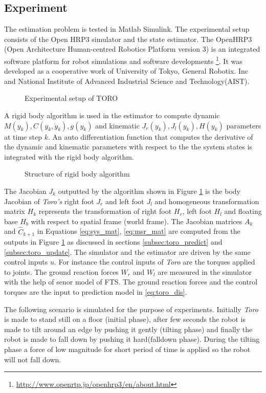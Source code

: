 \subsection{Experiment}
The estimation problem is tested in Matlab Simulink. The experimental setup consists of the Open HRP3 simulator and the state estimator. The OpenHRP3 (Open Architecture Human-centred Robotics Platform version 3) is an integrated software platform for robot simulations and software developments \footnote{\url{http://www.openrtp.jp/openhrp3/en/about.html}}. It was developed as a cooperative work of University of Tokyo, General Robotix. Inc and National Institute of Advanced Industrial Science and Technology(AIST).

\begin{figure}
    \centering
    
    \caption{Experimental setup of TORO}
\end{figure}

A rigid body algorithm is used in the estimator to compute dynamic $M(y_k), C(y_k,\dot y_k), g(y_k)$ and kinematic $J_r(y_k), J_l(y_k), H(y_k)$ parameters at time step $k$. An auto differentiation function that computes the derivative of the dynamic and kinematic parameters with respect to the the system states is integrated with the rigid body algorithm. 
\begin{figure}[h]
    \centering
    
    \caption{Structure of rigid body algorithm}
    \label{fig:luc_dyn}
\end{figure}
The Jacobian $J_k$ outputted by the algorithm shown in Figure \ref{fig:luc_dyn} is the body Jacobian of \emph{Toro's} right foot $J_r$ and left foot $J_l$ and homogeneous transformation matrix $H_k$ represents the transformation of right foot $H_r$, left foot $H_l$ and floating base $H_b$ with respect to spatial frame (world frame).
The Jacobian matrices $A_k$ and $\hat C_{k+1}$ in Equations \ref{eq:sys_mat}, \ref{eq:msr_mat} are computed from the outputs in Figure \ref{fig:luc_dyn} as discussed in sections \ref{subsec:toro_predict} and \ref{subsec:toro_update}. The simulator and the estimator are driven by the same control inputs $u$. For instance the control inputs of \emph{Toro} are the torques applied to joints. The ground reaction forces $W_r$ and $W_l$ are measured in the simulator with the help of senor model of FTS. The ground reaction forces and the control torques are the input to prediction model in \ref{eq:toro_dis}.

The following scenario is simulated for the purpose of experiments. Initially \emph{Toro} is made to stand still on a floor (initial phase), after few seconds the robot is made to tilt around an edge by pushing it gently (tilting phase) and finally the robot is made to fall down by pushing it hard(falldown phase). During the tilting phase a force of low magnitude for short period of time is applied so the robot will not fall down.

